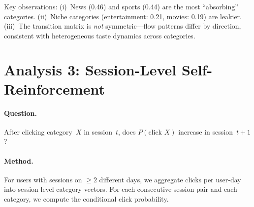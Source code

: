 \documentclass[11pt]{article}
\begin{document}
Key observations: (i)~News (0.46) and sports (0.44) are the most ``absorbing'' categories. (ii)~Niche categories (entertainment: 0.21, movies: 0.19) are leakier. (iii)~The transition matrix is \emph{not} symmetric---flow patterns differ by direction, consistent with heterogeneous taste dynamics across categories.


\section{Analysis 3: Session-Level Self-Reinforcement}

\paragraph{Question.} After clicking category~$X$ in session~$t$, does $P(\text{click } X)$ increase in session~$t+1$?

\paragraph{Method.} For users with sessions on $\geq 2$ different days, we aggregate clicks per user-day into session-level category vectors. For each consecutive session pair and each category, we compute the conditional click probability.
\end{document}
